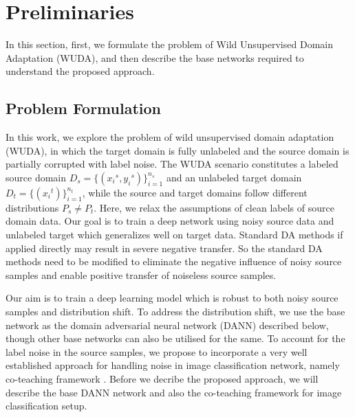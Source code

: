 \section{Preliminaries}

In this section, first, we formulate the problem of Wild Unsupervised Domain Adaptation (WUDA), and then describe the base networks required to understand the proposed approach.

\subsection{Problem Formulation}
In this work, we explore the problem of wild unsupervised domain adaptation (WUDA), in which the target domain is fully unlabeled and the source domain is partially corrupted with label noise. 
The WUDA scenario constitutes a labeled source domain ${D}_s = \{({x_i}^s, {y_i}^s)\}_{i=1}^{n_s}$ and an unlabeled target domain ${D}_t = \{({x_i}^t)\}_{i=1}^{n_t}$, while the source and target domains follow different distributions $P_s \neq P_t$. Here, we relax the assumptions of clean labels of source domain data.  Our goal is to train a deep network using noisy source data and unlabeled target which generalizes well on target data. Standard DA methods if applied directly may result in severe negative transfer. 
So the standard DA methods need to be modified to eliminate the negative influence of noisy source samples and enable positive transfer of noiseless source samples.

Our aim is to train a deep learning model which is robust to both noisy source samples and distribution shift. 
To address the distribution shift, we use the base network as the domain adversarial neural network (DANN) described below, though other base networks can also be utilised for the same.
To account for the label noise in the source samples, we propose to incorporate a very well established approach for handling noise in image classification network, namely co-teaching framework \cite{coteaching}.
Before we decribe the proposed approach, we will describe the base DANN network and also the co-teaching framework for image classification setup.

